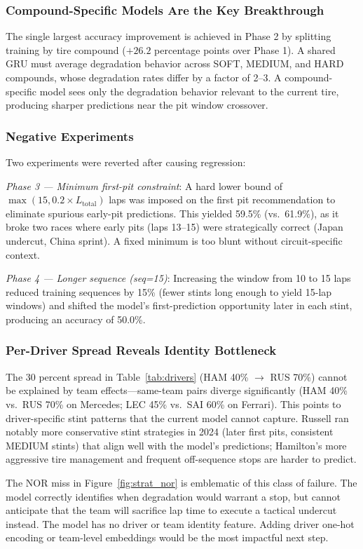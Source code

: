 \FloatBarrier
\subsubsection{Compound-Specific Models Are the Key Breakthrough}

The single largest accuracy improvement is achieved in Phase 2 by splitting training by tire compound ($+26.2$ percentage points over Phase 1). A shared GRU must average degradation behavior across SOFT, MEDIUM, and HARD compounds, whose degradation rates differ by a factor of 2--3. A compound-specific model sees only the degradation behavior relevant to the current tire, producing sharper predictions near the pit window crossover.

\FloatBarrier
\subsubsection{Negative Experiments}

Two experiments were reverted after causing regression:

\textit{Phase 3 --- Minimum first-pit constraint}: A hard lower bound of $\max(15, 0.2 \times L_\text{total})$ laps was imposed on the first pit recommendation to eliminate spurious early-pit predictions. This yielded 59.5\% (vs.\ 61.9\%), as it broke two races where early pits (laps 13--15) were strategically correct (Japan undercut, China sprint). A fixed minimum is too blunt without circuit-specific context.

\textit{Phase 4 --- Longer sequence (seq=15)}: Increasing the window from 10 to 15 laps reduced training sequences by 15\% (fewer stints long enough to yield 15-lap windows) and shifted the model's first-prediction opportunity later in each stint, producing an accuracy of 50.0\%.

\FloatBarrier
\subsubsection{Per-Driver Spread Reveals Identity Bottleneck}

The 30 percent spread in Table~\ref{tab:drivers} (HAM 40\% $\to$ RUS 70\%) cannot be explained by team effects---same-team pairs diverge significantly (HAM 40\% vs.\ RUS 70\% on Mercedes; LEC 45\% vs.\ SAI 60\% on Ferrari). This points to driver-specific stint patterns that the current model cannot capture. Russell ran notably more conservative stint strategies in 2024 (later first pits, consistent MEDIUM stints) that align well with the model's predictions; Hamilton's more aggressive tire management and frequent off-sequence stops are harder to predict.

The NOR miss in Figure~\ref{fig:strat_nor} is emblematic of this class of failure. The model correctly identifies when degradation would warrant a stop, but cannot anticipate that the team will sacrifice lap time to execute a tactical undercut instead. The model has no driver or team identity feature. Adding driver one-hot encoding or team-level embeddings would be the most impactful next step.
